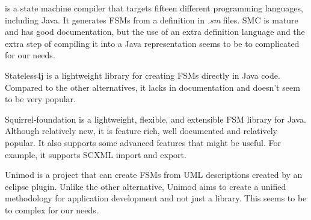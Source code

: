  is a state machine compiler that targets fifteen different programming languages, including Java.
It generates FSMs from a definition in \textit{.sm} files.
SMC is mature and has good documentation, but the use of an extra definition language and the extra step of compiling it into a Java representation seems to be to complicated for our needs.

Stateless4j is a lightweight library for creating FSMs directly in Java code.
Compared to the other alternatives, it lacks in documentation and doesn't seem to be very popular.

Squirrel-foundation is a lightweight, flexible, and extensible FSM library for Java.
Although relatively new, it is feature rich, well documented and relatively popular.
It also supports some advanced features that might be useful.
For example, it supports SCXML import and export.

Unimod is a project that can create FSMs from UML descriptions created by an eclipse plugin.
Unlike the other alternative, Unimod aims to create a unified methodology for application development and not just a library.
This seems to be to complex for our needs.
